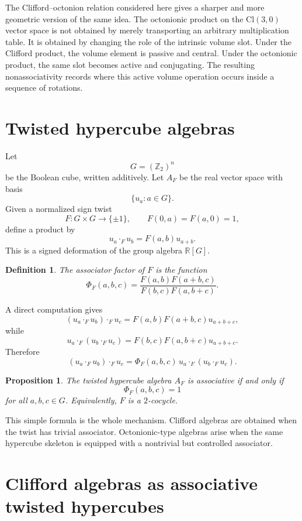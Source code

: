 \documentclass[11pt]{article}
\newtheorem{definition}{Definition}
\newtheorem{proposition}{Proposition}
\newcommand{\Ztwo}{\mathbb Z_2}
\newcommand{\R}{\mathbb R}
\newcommand{\Cl}{\mathrm{Cl}}
\newcommand{\assoc}{\Phi}
\begin{document}
The Clifford--octonion relation considered here gives a sharper and more
geometric version of the same idea. The octonionic product on the
$\Cl(3,0)$ vector space is not obtained by merely transporting an arbitrary
multiplication table. It is obtained by changing the role of the intrinsic
volume slot. Under the Clifford product, the volume element is passive and
central. Under the octonionic product, the same slot becomes active and
conjugating. The resulting nonassociativity records where this active volume
operation occurs inside a sequence of rotations.

\section{Twisted hypercube algebras}

Let
\[
G = (\Ztwo)^n
\]
be the Boolean cube, written additively. Let $A_F$ be the real vector space
with basis
\[
\{u_a : a\in G\}.
\]
Given a normalized sign twist
\[
F:G\times G\to \{\pm 1\},
\qquad
F(0,a)=F(a,0)=1,
\]
define a product by
\[
u_a\cdot_F u_b = F(a,b)u_{a+b}.
\]
This is a signed deformation of the group algebra $\R[G]$.

\begin{definition}
The associator factor of $F$ is the function
\[
\assoc_F(a,b,c)
=
\frac{F(a,b)F(a+b,c)}
     {F(b,c)F(a,b+c)}.
\]
\end{definition}

A direct computation gives
\[
(u_a\cdot_F u_b)\cdot_F u_c
=
F(a,b)F(a+b,c)u_{a+b+c},
\]
while
\[
u_a\cdot_F (u_b\cdot_F u_c)
=
F(b,c)F(a,b+c)u_{a+b+c}.
\]
Therefore
\[
(u_a\cdot_F u_b)\cdot_F u_c
=
\assoc_F(a,b,c)\,
u_a\cdot_F (u_b\cdot_F u_c).
\]

\begin{proposition}
The twisted hypercube algebra $A_F$ is associative if and only if
\[
\assoc_F(a,b,c)=1
\]
for all $a,b,c\in G$.
Equivalently, $F$ is a $2$-cocycle.
\end{proposition}

This simple formula is the whole mechanism. Clifford algebras are obtained
when the twist has trivial associator. Octonionic-type algebras arise when
the same hypercube skeleton is equipped with a nontrivial but controlled
associator.

\section{Clifford algebras as associative twisted hypercubes}
\end{document}
